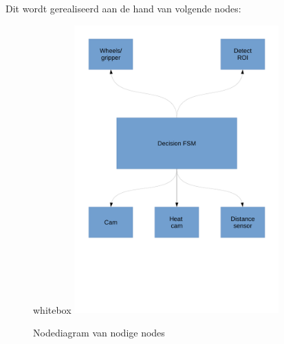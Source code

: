 \documentclass{beamer}
\begin{document}
\begin{frame}[t]
\begin{columns}[t]
\begin{column}{.49\textwidth}
\begin{figure}
	\end{figure}

	\vspace{0.5em}
	
	Dit wordt gerealiseerd aan de hand van volgende nodes:
	\begin{figure}
	 \begin{beamercolorbox}{whitebox}
	  \centering
	  \includegraphics[width=0.7\textwidth]{../../Docs/node_diagram.pdf}
	  \caption{Nodediagram van nodige nodes}
	 \end{beamercolorbox}

	\end{figure}
	
	\end{column}



\end{columns}
\end{frame}
\end{document}
